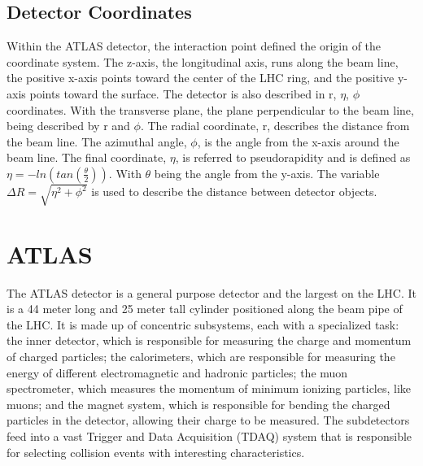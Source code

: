 \subsection{Detector Coordinates}
Within the ATLAS detector, the interaction point defined the origin of the coordinate system. The z-axis, the longitudinal axis, runs along the beam line, the positive x-axis points toward the center of the LHC ring, and the positive y-axis points toward the surface. The detector is also described in r, ${\eta}$, ${\phi}$ coordinates. With the transverse plane, the plane perpendicular to the beam line, being described by r and ${\phi}$. The radial coordinate, r, describes the distance from the beam line. The azimuthal angle, ${\phi}$, is the angle from the x-axis around the beam line. The final coordinate, ${\eta}$, is referred to pseudorapidity and is defined as ${\eta = -ln(tan(\frac{\theta}{2}))}$. With ${\theta}$ being the angle from the y-axis. The variable ${\Delta{R}=\sqrt{\eta^{2} + \phi^{2}}}$ is used to describe the distance between detector objects.
\section{ATLAS}
The ATLAS detector is a general purpose detector and the largest on the LHC. It is a 44 meter long and 25 meter tall cylinder positioned along the beam pipe of the LHC. It is made up of concentric subsystems, each with a specialized task: the inner detector, which is responsible for measuring the charge and momentum of charged particles; the calorimeters, which are responsible for measuring the energy of different electromagnetic and hadronic particles; the muon spectrometer, which measures the momentum of minimum ionizing particles, like muons; and the magnet system, which is responsible for bending the charged particles in the detector, allowing their charge to be measured. The subdetectors feed into a vast Trigger and Data Acquisition (TDAQ) system that is responsible for selecting collision events with interesting characteristics.

